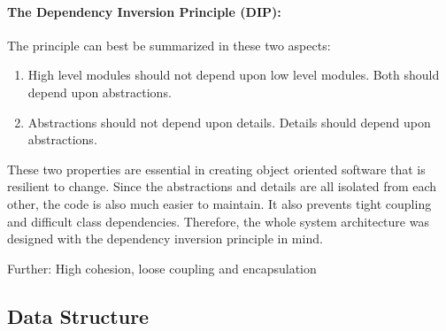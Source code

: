 \paragraph{The Dependency Inversion Principle (DIP):}
The principle can best be summarized in these two aspects:
\begin{enumerate}
\item High level modules should not depend upon low level modules. Both should depend upon abstractions.
\item Abstractions should not depend upon details. Details should depend upon abstractions.
\end{enumerate}
These two properties are essential in creating object oriented software that is resilient to change. Since the abstractions and details are all isolated from each other, the code is also much easier to maintain. It also prevents tight coupling and difficult class dependencies. Therefore, the whole system architecture was designed with the dependency inversion principle in mind.


Further: High cohesion, loose coupling and encapsulation
 
\subsection{Data Structure}\label{sec:data_structures}
